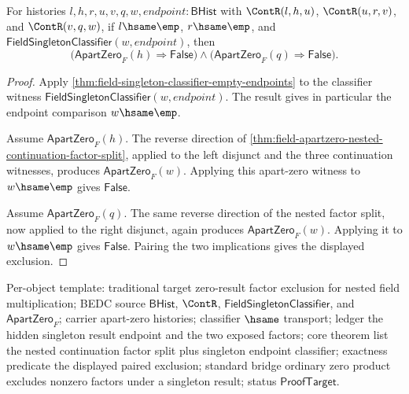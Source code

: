 \begin{theorem}
\label{thm:field-apartzero-nested-continuation-singleton-result-factor-absurd}
For histories $l,h,r,u,v,q,w,endpoint:\mathsf{BHist}$ with
$\ContR(l,h,u)$, $\ContR(u,r,v)$, and $\ContR(v,q,w)$, if
$l\hsame\emp$, $r\hsame\emp$, and
$\mathsf{FieldSingletonClassifier}(w,endpoint)$, then
$$
\bigl(\mathsf{ApartZero}_F(h)\Rightarrow\mathsf{False}\bigr)\land
\bigl(\mathsf{ApartZero}_F(q)\Rightarrow\mathsf{False}\bigr).
$$
\end{theorem}
\begin{proof}
Apply \autoref{thm:field-singleton-classifier-empty-endpoints} to the
classifier witness $\mathsf{FieldSingletonClassifier}(w,endpoint)$. The
result gives in particular the endpoint comparison $w\hsame\emp$.

Assume $\mathsf{ApartZero}_F(h)$. The reverse direction of
\autoref{thm:field-apartzero-nested-continuation-factor-split}, applied to
the left disjunct and the three continuation witnesses, produces
$\mathsf{ApartZero}_F(w)$. Applying this apart-zero witness to
$w\hsame\emp$ gives $\mathsf{False}$.

Assume $\mathsf{ApartZero}_F(q)$. The same reverse direction of the nested
factor split, now applied to the right disjunct, again produces
$\mathsf{ApartZero}_F(w)$. Applying it to $w\hsame\emp$ gives
$\mathsf{False}$. Pairing the two implications gives the displayed
exclusion.
\end{proof}

Per-object template: traditional target zero-result factor exclusion for
nested field multiplication; BEDC source $\mathsf{BHist}$, $\ContR$,
$\mathsf{FieldSingletonClassifier}$, and $\mathsf{ApartZero}_F$; carrier
apart-zero histories; classifier $\hsame$ transport; ledger the hidden
singleton result endpoint and the two exposed factors; core theorem list
the nested continuation factor split plus singleton endpoint classifier;
exactness predicate the displayed paired exclusion; standard bridge ordinary
zero product excludes nonzero factors under a singleton result; status
$\mathsf{ProofTarget}$.

